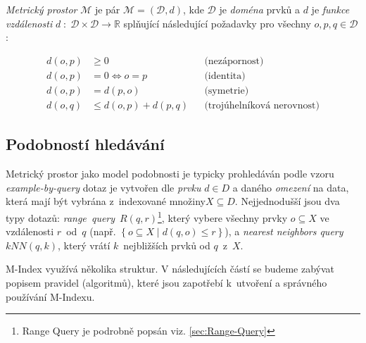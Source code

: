 \emph{Metrický prostor }$\mathcal{M}$ je pár $\mathcal{M}=(\mathcal{D},d)$,
kde $\mathcal{D}$ je \emph{doména} prvků a $d$ je \emph{funkce vzdálenosti}
$d\;:\;\mathcal{D}\times\mathcal{D}\rightarrow\mathbb{R}$ splňující
následující požadavky pro všechny $o,p,q\in\mathcal{D}$:

\begin{align*}
d(o,p) & \geq0 &  & \textrm{(nezápornost)}\\
d(o,p) & =0\Longleftrightarrow o=p &  & \textrm{(identita)}\\
d(o,p) & =d(p,o) &  & \textrm{(symetrie)}\\
d(o,q) & \leq d(o,p)+d(p,q) &  & \textrm{(trojúhelníková nerovnost)}
\end{align*}



\subsection{Podobností hledávání}

Metrický prostor jako model podobnosti je typicky prohledáván podle
vzoru \emph{example-by-query} \textendash{} dotaz je vytvořen dle
\emph{prvku} $d\in D$ a daného \emph{omezení} na data, která mají
být vybrána z~indexované množiny$X\subseteq D$\@. Nejjednodušší
jsou dva typy dotazů: \emph{range~query}~$R(q,r)$\footnote{Range Query je podrobně popsán viz. \vref{sec:Range-Query}
}, který vybere všechny prvky $o\subseteq X$ ve vzdálenosti $r$~od~$q$
(např. $\left\{ o\subseteq X\mid d(q,o)\leq r\right\} $), a \emph{nearest
neighbors query} $kNN(q,k)$, který vrátí $k$~nejbližších prvků
od $q$~z~$X$\@.

M-Index využívá několika struktur\@. V následujících částí se budeme
zabývat popisem pravidel (algoritmů), které jsou zapotřebí k~utvoření
a správného používání M-Indexu.